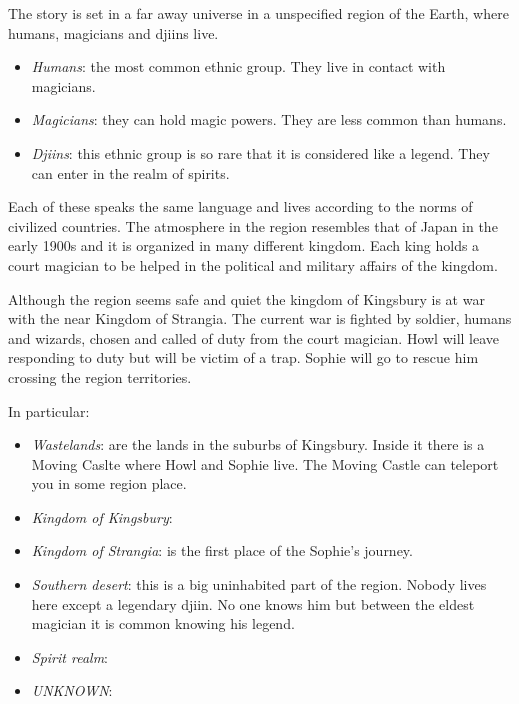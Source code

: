 The story is set in a far away universe in a unspecified region of the Earth, where humans, magicians and djiins live.
\begin{itemize}
\item \textit{Humans}: the most common ethnic group. They live in contact with magicians. 
\item \textit{Magicians}: they can hold magic powers. They are less common than humans.
\item \textit{Djiins}: this ethnic group is so rare that it is considered like a legend. They can enter in the realm of spirits.
\end{itemize}
Each of these speaks the same language and lives according to the norms of civilized countries.
The atmosphere in the region resembles that of Japan in the early 1900s and it is organized in many different kingdom.
Each king holds a court magician to be helped in the political and military affairs of the kingdom.

Although the region seems safe and quiet the kingdom of Kingsbury is at war with the near Kingdom of Strangia.
The current war is fighted by soldier, humans and wizards, chosen and called of duty from the court magician.
Howl will leave responding to duty but will be victim of a trap. Sophie will go to rescue him crossing the region territories.

In particular:
\begin{itemize}
\item \textit{Wastelands}:
  are the lands in the suburbs of Kingsbury. Inside it there is a Moving Caslte where Howl and Sophie live. The Moving Castle can teleport you in some region place.
\item \textit{Kingdom of Kingsbury}:  
\item \textit{Kingdom of Strangia}: is the first place of the Sophie's journey. 
\item \textit{Southern desert}: this is a big uninhabited part of the region. Nobody lives here except a legendary djiin. No one knows him but between the eldest magician it is common knowing his legend.
\item \textit{Spirit realm}:
\item \textit{UNKNOWN}:
\end{itemize}



